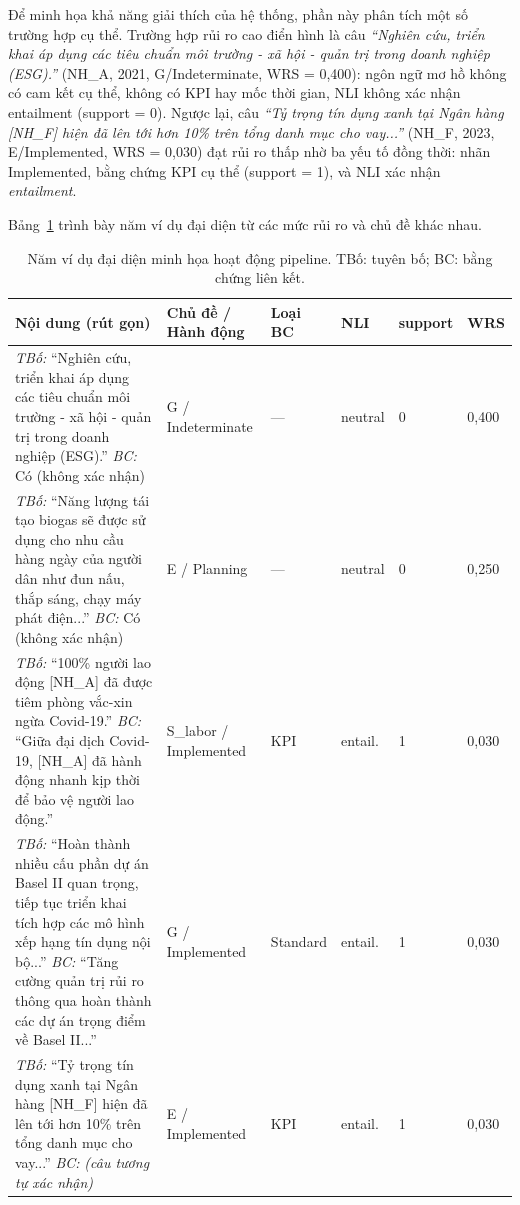 Để minh họa khả năng giải thích của hệ thống, phần này phân tích một số trường hợp cụ thể. Trường hợp rủi ro cao điển hình là câu \textit{``Nghiên cứu, triển khai áp dụng các tiêu chuẩn môi trường - xã hội - quản trị trong doanh nghiệp (ESG).''} (NH\_A, 2021, G/Indeterminate, WRS = 0,400): ngôn ngữ mơ hồ không có cam kết cụ thể, không có KPI hay mốc thời gian, NLI không xác nhận entailment (support = 0). Ngược lại, câu \textit{``Tỷ trọng tín dụng xanh tại Ngân hàng [NH\_F] hiện đã lên tới hơn 10\% trên tổng danh mục cho vay...''} (NH\_F, 2023, E/Implemented, WRS = 0,030) đạt rủi ro thấp nhờ ba yếu tố đồng thời: nhãn Implemented, bằng chứng KPI cụ thể (support = 1), và NLI xác nhận \textit{entailment}.

Bảng~\ref{tab:qual_examples} trình bày năm ví dụ đại diện từ các mức rủi ro và chủ đề khác nhau.

\begin{table}[H]
\centering
\caption{Năm ví dụ đại diện minh họa hoạt động pipeline. TBố: tuyên bố; BC: bằng chứng liên kết.}
\label{tab:qual_examples}
\footnotesize
\begin{tabular}{p{}p{}p{}p{}p{}p{}}
\toprule
\textbf{Nội dung (rút gọn)} & \textbf{Chủ đề / Hành động} & \textbf{Loại BC} & \textbf{NLI} & \textbf{support} & \textbf{WRS} \\
\midrule
\textit{TBố:} ``Nghiên cứu, triển khai áp dụng các tiêu chuẩn môi trường - xã hội - quản trị trong doanh nghiệp (ESG).'' \newline \textit{BC:} Có (không xác nhận)
    & G / Indeterminate & --- & neutral & 0 & 0,400 \\
\midrule
\textit{TBố:} ``Năng lượng tái tạo biogas sẽ được sử dụng cho nhu cầu hàng ngày của người dân như đun nấu, thắp sáng, chạy máy phát điện...'' \newline \textit{BC:} Có (không xác nhận)
    & E / Planning & --- & neutral & 0 & 0,250 \\
\midrule
\textit{TBố:} ``100\% người lao động [NH\_A] đã được tiêm phòng vắc-xin ngừa Covid-19.'' \newline \textit{BC:} ``Giữa đại dịch Covid-19, [NH\_A] đã hành động nhanh kịp thời để bảo vệ người lao động.''
    & S\_labor / Implemented & KPI & entail. & 1 & 0,030 \\
\midrule
\textit{TBố:} ``Hoàn thành nhiều cấu phần dự án Basel II quan trọng, tiếp tục triển khai tích hợp các mô hình xếp hạng tín dụng nội bộ...'' \newline \textit{BC:} ``Tăng cường quản trị rủi ro thông qua hoàn thành các dự án trọng điểm về Basel II...''
    & G / Implemented & Standard & entail. & 1 & 0,030 \\
\midrule
\textit{TBố:} ``Tỷ trọng tín dụng xanh tại Ngân hàng [NH\_F] hiện đã lên tới hơn 10\% trên tổng danh mục cho vay...'' \newline \textit{BC:} \textit{(câu tương tự xác nhận)}
    & E / Implemented & KPI & entail. & 1 & 0,030 \\
\bottomrule
\end{tabular}
\end{table}

